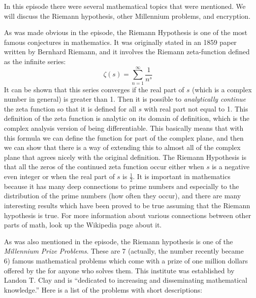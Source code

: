 \newpage
{}
{}
\setcounter{activity}{0}

In this episode there were several mathematical topics that were mentioned. We will discuss the Riemann hypothesis, other Millennium problems, and encryption. \\



As was made obvious in the episode, the Riemann Hypothesis is one of the most famous conjectures in mathematics. It was originally stated in an 1859 paper written by Bernhard Riemann, and it involves the Riemann zeta-function defined as the infinite series:
	\[
	\zeta(s)= \sum_{n=1}^\infty \frac{1}{n^s}
	\]
It can be shown that this series converges if the real part of $s$ (which is a complex number in general) is greater than 1. Then it is possible to \emph{analytically continue} the zeta function so that it is defined for all $s$ with real part not equal to 1. This definition of the zeta function is analytic on its domain of definition, which is the complex analysis version of being differentiable. This basically means that with this formula we can define the function for part of the complex plane, and then we can show that there is a way of extending this to almost all of the complex plane that agrees nicely with the original definition. The Riemann Hypothesis is that all the zeros of the continued zeta function occur either when $s$ is a negative even integer or when the real part of $s$ is $\frac{1}{2}$. It is important in mathematics because it has many deep connections to prime numbers and especially to the distribution of the prime numbers (how often they occur), and there are many interesting results which have been proved to be true assuming that the Riemann hypothesis is true. For more information about various connections between other parts of math, look up the Wikipedia page about it.


As was also mentioned in the episode, the Riemann hypothesis is one of the \emph{Millennium Prize Problems}. These are 7 (actually, the number recently became 6) famous mathematical problems which come with a prize of one million dollars offered by the  for anyone who solves them. This institute was established by Landon T. Clay and is ``dedicated to increasing and disseminating mathematical knowledge.'' Here is a list of the problems with short descriptions:

